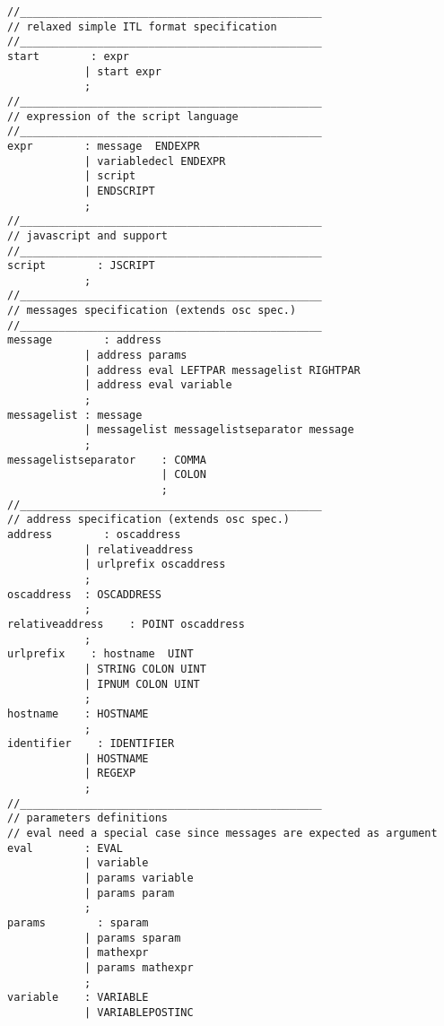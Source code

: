 
\label{yacc}

\begin{verbatim}
//_______________________________________________
// relaxed simple ITL format specification
//_______________________________________________
start        : expr
            | start expr
            ;
//_______________________________________________
// expression of the script language
//_______________________________________________
expr        : message  ENDEXPR        
            | variabledecl ENDEXPR    
            | script            
            | ENDSCRIPT            
            ;
//_______________________________________________
// javascript and support
//_______________________________________________
script        : JSCRIPT            
            ;
//_______________________________________________
// messages specification (extends osc spec.)
//_______________________________________________
message        : address                    
            | address params            
            | address eval LEFTPAR messagelist RIGHTPAR
            | address eval variable        
            ;
messagelist : message                    
            | messagelist messagelistseparator message 
            ;
messagelistseparator    : COMMA
                        | COLON
                        ;
//_______________________________________________
// address specification (extends osc spec.)
address        : oscaddress                
            | relativeaddress            
            | urlprefix oscaddress        
            ;
oscaddress  : OSCADDRESS                
            ;
relativeaddress    : POINT oscaddress        
            ;
urlprefix    : hostname  UINT            
            | STRING COLON UINT            
            | IPNUM COLON UINT            
            ;
hostname    : HOSTNAME                    
            ;
identifier    : IDENTIFIER                
            | HOSTNAME                    
            | REGEXP                    
            ;
//_______________________________________________
// parameters definitions
// eval need a special case since messages are expected as argument
eval        : EVAL                
            | variable                
            | params variable        
            | params param            
            ;
params        : sparam                
            | params sparam            
            | mathexpr                
            | params mathexpr        
            ;
variable    : VARIABLE                
            | VARIABLEPOSTINC        

\end{verbatim}
